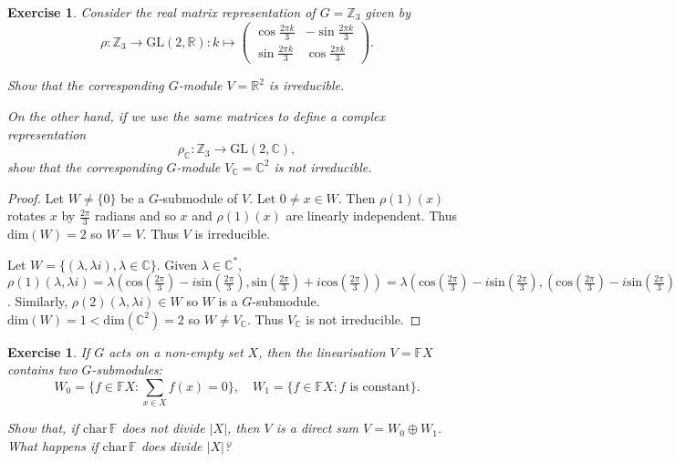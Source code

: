 \documentclass{article}
\newtheorem{exercise}[theorem]{Exercise}
\begin{document}
\begin{exercise}
Consider the real matrix representation of \( G = \mathbb{Z}_3 \) given by
\[
\rho : \mathbb{Z}_3 \to \mathrm{GL}(2, \mathbb{R}) : k \mapsto
\begin{pmatrix}
\cos \frac{2\pi k}{3} & -\sin \frac{2\pi k}{3} \\
\sin \frac{2\pi k}{3} & \cos \frac{2\pi k}{3}
\end{pmatrix}.
\]

Show that the corresponding \( G \)-module \( V = \mathbb{R}^2 \) is irreducible.

On the other hand, if we use the same matrices to define a complex representation
\[
\rho_{\mathbb{C}} : \mathbb{Z}_3 \to \mathrm{GL}(2, \mathbb{C}),
\]
show that the corresponding \( G \)-module \( V_{\mathbb{C}} = \mathbb{C}^2 \) is not irreducible.

\end{exercise}

\begin{proof}
Let $W\neq \{0\}$ be a $G$-submodule of $V$. Let $0\neq x\in W$. Then $\rho(1)(x)$ rotates $x$ by $\frac{2\pi}{3}$ radians and so $x$ and $\rho(1)(x)$ are linearly independent. Thus $\text{dim}(W)=2$ so $W=V$. Thus $V$ is irreducible.

Let $W=\{(\lambda,\lambda i),\lambda\in\mathbb{C}\}$. Given $\lambda\in\mathbb{C}^*$, $\rho(1)(\lambda,\lambda i)=\lambda(\text{cos}(\frac{2\pi}{3})-i\text{sin}(\frac{2\pi}{3}),\text{sin}(\frac{2\pi}{3})+i\text{cos}(\frac{2\pi}{3}))=\lambda(\text{cos}(\frac{2\pi}{3})-i\text{sin}(\frac{2\pi}{3}),(\text{cos}(\frac{2\pi}{3})-i\text{sin}(\frac{2\pi}{3}))i)=(\text{cos}(\frac{2\pi}{3})-i\text{sin}(\frac{2\pi}{3}))(\lambda,\lambda i)\in W$. Similarly, $\rho(2)(\lambda,\lambda i)\in W$ so $W$ is a $G$-submodule. $\text{dim}(W)=1<\text{dim}(\mathbb{C}^2)=2$ so $W\neq V_\mathbb{C}$. Thus $V_\mathbb{C}$ is not irreducible.
\end{proof}

\begin{exercise}
If \( G \) acts on a non-empty set \( X \), then the linearisation \( V = \mathbb{F}X \) contains two \( G \)-submodules:
\[
W_0 = \{ f \in \mathbb{F}X : \sum_{x \in X} f(x) = 0 \}, \quad
W_1 = \{ f \in \mathbb{F}X : f \text{ is constant} \}.
\]

Show that, if \( \mathrm{char} \, \mathbb{F} \) does not divide \( |X| \), then \( V \) is a direct sum \( V = W_0 \oplus W_1 \). What happens if \( \mathrm{char} \, \mathbb{F} \) does divide \( |X| \)?

\end{exercise}
\end{document}
